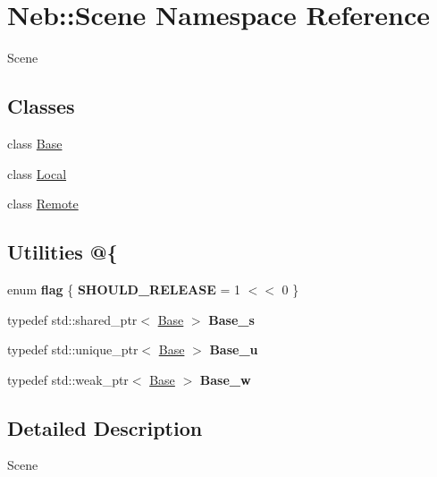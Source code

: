 \hypertarget{namespaceNeb_1_1Scene}{\section{Neb\-:\-:Scene Namespace Reference}
\label{namespaceNeb_1_1Scene}
}


Scene  


\subsection*{Classes}
\begin{DoxyCompactItemize}
\item 
class \hyperlink{classNeb_1_1Scene_1_1Base}{Base}
\item 
class \hyperlink{classNeb_1_1Scene_1_1Local}{Local}
\item 
class \hyperlink{classNeb_1_1Scene_1_1Remote}{Remote}
\end{DoxyCompactItemize}
\subsection*{Utilities @\{}
\begin{DoxyCompactItemize}
\item 
enum {\bfseries flag} \{ {\bfseries S\-H\-O\-U\-L\-D\-\_\-\-R\-E\-L\-E\-A\-S\-E} = 1 $<$$<$ 0
 \}
\item 
\hypertarget{namespaceNeb_1_1Scene_aebcf94cf65fb1252f20b8eb7c0d145bf}{typedef std\-::shared\-\_\-ptr$<$ \hyperlink{classNeb_1_1Scene_1_1Base}{Base} $>$ {\bfseries Base\-\_\-s}}\label{namespaceNeb_1_1Scene_aebcf94cf65fb1252f20b8eb7c0d145bf}

\item 
\hypertarget{namespaceNeb_1_1Scene_a09fb947e0af96de8b83d0f872b128c40}{typedef std\-::unique\-\_\-ptr$<$ \hyperlink{classNeb_1_1Scene_1_1Base}{Base} $>$ {\bfseries Base\-\_\-u}}\label{namespaceNeb_1_1Scene_a09fb947e0af96de8b83d0f872b128c40}

\item 
\hypertarget{namespaceNeb_1_1Scene_a13c1594227693bd4c0ca2fcf841a5f8d}{typedef std\-::weak\-\_\-ptr$<$ \hyperlink{classNeb_1_1Scene_1_1Base}{Base} $>$ {\bfseries Base\-\_\-w}}\label{namespaceNeb_1_1Scene_a13c1594227693bd4c0ca2fcf841a5f8d}

\end{DoxyCompactItemize}


\subsection{Detailed Description}
Scene 